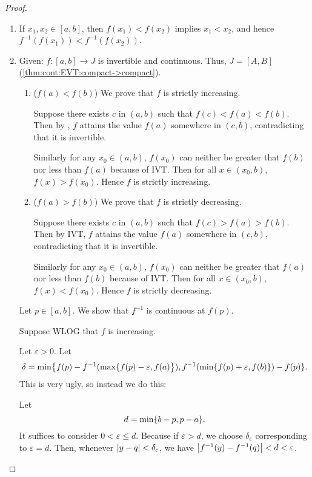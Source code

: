 \begin{proof} \leavevmode
    \begin{enumerate}[label=(\roman*)]
        \item If $x_{1}, x_{2} \in [a, b]$, then $f(x_{1}) < f(x_{2})$ implies $x_{1} < x_{2}$, and hence $f^{-1}(f(x_{1})) < f^{-1}(f(x_{2}))$.
        \item Given: $f : [a, b] \to J$ is invertible and continuous.
        Thus, $J = [A, B]$ (\cref{thm:cont:EVT:compact->compact}).
        \begin{enumerate}[label= (Case \arabic*)]
            \item ($f(a) < f(b)$) We prove that $f$ is strictly increasing.

            Suppose there exists $c$ in $(a, b)$ such that $f(c) < f(a) < f(b)$.
            Then by , $f$ attains the value $f(a)$ somewhere in $(c, b)$, contradicting that it is invertible.

            Similarly for any $x_{0} \in (a, b)$, $f(x_{0})$ can neither be greater that $f(b)$ nor less than $f(a)$ because of IVT.
            Then for all $x \in (x_{0}, b)$, $f(x) > f(x_{0})$.
            Hence $f$ is strictly increasing.

            \item ($f(a) > f(b)$) We prove that $f$ is strictly decreasing.

            Suppose there exists $c$ in $(a, b)$ such that $f(c) > f(a) > f(b)$.
            Then by IVT, $f$ attains the value $f(a)$ somewhere in $(c, b)$, contradicting that it is invertible.

            Similarly for any $x_{0} \in (a, b)$, $f(x_{0})$ can neither be greater that $f(a)$ nor less than $f(b)$ because of IVT.
            Then for all $x \in (x_{0}, b)$, $f(x) < f(x_{0})$.
            Hence $f$ is strictly decreasing.
        \end{enumerate}
        Let $p \in [a, b]$.
        We show that $f^{-1}$ is continuous at $f(p)$.

        Suppose WLOG that $f$ is increasing.

        Let $\varepsilon > 0$.
        Let \[
            \delta = \min\set{f(p) - f^{-1}(\max \{f(p) - \varepsilon, f(a)}), f^{-1}(\min \set{f(p) + \varepsilon, f(b)}) - f(p)\}.
        \]
        This is very ugly, so instead we do this:

        Let \[
            d = \min\set{b - p, p - a}.
        \] It suffices to consider $0 < \varepsilon \leq d$.
        Because if $\varepsilon > d$, we choose $\delta_{\varepsilon}$ corresponding to $\varepsilon = d$.
        Then, whenever $\abs{y - q} < \delta_{\varepsilon}$, we have $\abs{f^{-1}(y) - f^{-1}(q)} < d < \varepsilon$.
        

\end{enumerate}
\end{proof}

